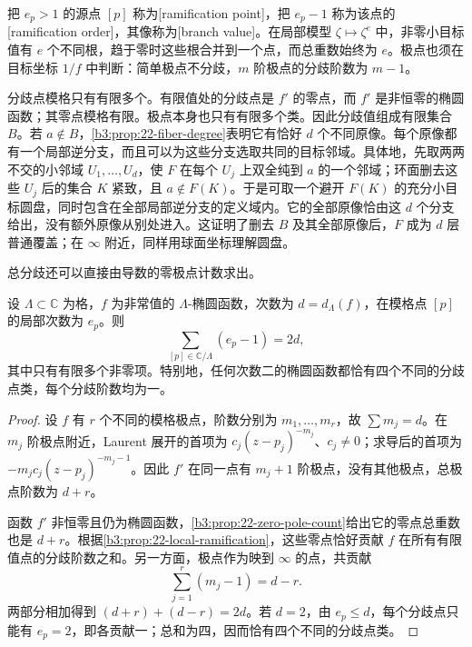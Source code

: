 把 \(e_p>1\) 的源点 \([p]\) 称为[ramification point]，把 \(e_p-1\) 称为该点的[ramification order]，其像称为[branch value]。在局部模型 \(\zeta\mapsto\zeta^e\) 中，非零小目标值有 \(e\) 个不同根，趋于零时这些根合并到一个点，而总重数始终为 \(e\)。极点也须在目标坐标 \(1/f\) 中判断：简单极点不分歧，\(m\) 阶极点的分歧阶数为 \(m-1\)。

\ProseParagraphBreak
分歧点模格只有有限多个。有限值处的分歧点是 \(f'\) 的零点，而 \(f'\) 是非恒零的椭圆函数；其零点模格有限。极点本身也只有有限多个类。因此分歧值组成有限集合 \(B\)。若 \(a\notin B\)，\cref{b3:prop:22-fiber-degree}表明它有恰好 \(d\) 个不同原像。每个原像都有一个局部逆分支，而且可以为这些分支选取共同的目标邻域。具体地，先取两两不交的小邻域 \(U_1,\ldots,U_d\)，使 \(F\) 在每个 \(U_j\) 上双全纯到 \(a\) 的一个邻域；环面删去这些 \(U_j\) 后的集合 \(K\) 紧致，且 \(a\notin F(K)\)。于是可取一个避开 \(F(K)\) 的充分小目标圆盘，同时包含在全部局部逆分支的定义域内。它的全部原像恰由这 \(d\) 个分支给出，没有额外原像从别处进入。这证明了删去 \(B\) 及其全部原像后，\(F\) 成为 \(d\) 层普通覆盖；在 \(\infty\) 附近，同样用球面坐标理解圆盘。

\ProseParagraphBreak
总分歧还可以直接由导数的零极点计数求出。

\begin{proposition}\label{b3:prop:22-total-ramification}
设 \(\Lambda\subset\mathbb C\) 为格，\(f\) 为非常值的 \(\Lambda\)-椭圆函数，次数为 \(d=d_\Lambda(f)\)，在模格点 \([p]\) 的局部次数为 \(e_p\)。则
\[
 \sum_{[p]\in\mathbb C/\Lambda}(e_p-1)=2d,
\]
其中只有有限多个非零项。特别地，任何次数二的椭圆函数都恰有四个不同的分歧点类，每个分歧阶数均为一。
\end{proposition}
\begin{proof}
设 \(f\) 有 \(r\) 个不同的模格极点，阶数分别为 \(m_1,\ldots,m_r\)，故 \(\sum m_j=d\)。在 \(m_j\) 阶极点附近，Laurent 展开的首项为 \(c_j(z-p_j)^{-m_j}\)、\(c_j\ne0\)；求导后的首项为 \(-m_jc_j(z-p_j)^{-m_j-1}\)。因此 \(f'\) 在同一点有 \(m_j+1\) 阶极点，没有其他极点，总极点阶数为 \(d+r\)。

函数 \(f'\) 非恒零且仍为椭圆函数，\cref{b3:prop:22-zero-pole-count}给出它的零点总重数也是 \(d+r\)。根据\cref{b3:prop:22-local-ramification}，这些零点恰好贡献 \(f\) 在所有有限值点的分歧阶数之和。另一方面，极点作为映到 \(\infty\) 的点，共贡献
\[
 \sum_{j=1}^r(m_j-1)=d-r.
\]
两部分相加得到 \((d+r)+(d-r)=2d\)。若 \(d=2\)，由 \(e_p\le d\)，每个分歧点只能有 \(e_p=2\)，即各贡献一；总和为四，因而恰有四个不同的分歧点类。
\end{proof}

